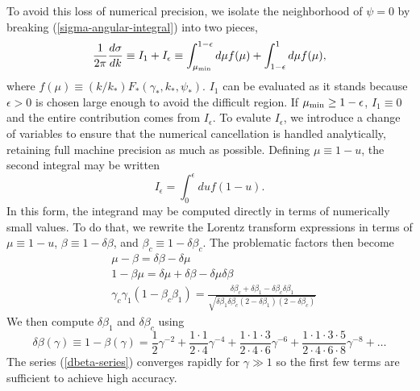 \documentclass[12pt]{article}
\begin{document}
To avoid this loss of numerical precision, we isolate the
neighborhood of $\psi = 0$ by
breaking (\ref{sigma-angular-integral}) into two pieces,
\begin{equation}
  \frac{1}{2\pi}\frac{d\sigma}{dk} \equiv I_1 + I_\epsilon
  \equiv
   \int_{\mu_{\rm min}}^{1 - \epsilon} d\mu f(\mu)
   + \int_{1-\epsilon}^1 d\mu f(\mu),
\end{equation}
where $f(\mu) \equiv (k/k_*)F_*(\gamma_*, k_*, \psi_*)$.
$I_1$ can be evaluated as it stands because $\epsilon > 0$ is
chosen large enough to avoid the difficult region. If $\mu_{\rm min}
\geq 1 - \epsilon$, $I_1 \equiv 0$ and the entire contribution
comes from $I_\epsilon$. To evalute $I_\epsilon$, we introduce
a change of variables to ensure that the numerical cancellation
is handled analytically, retaining full machine precision
as much as possible. Defining $\mu \equiv 1 - u$,
the second integral may be written
\begin{equation}
  I_\epsilon = \int_0^\epsilon du f(1-u).
\end{equation}
In this form, the integrand may be computed directly in terms of
numerically small values.  To do that, we rewrite the
Lorentz transform expressions in terms of $\mu \equiv 1-u$,
$\beta \equiv 1 - \delta\beta$, and
$\beta_c \equiv 1 - \delta\beta_c$.  The problematic factors
then become
\begin{eqnarray}
 &\mu - \beta = \delta\beta - \delta\mu \nonumber\\
 &1 - \beta\mu = \delta\mu + \delta\beta - \delta\mu\delta\beta \\
 &\gamma_c \gamma_1 (1 - \beta_c\beta_1) =
 \frac{\delta\beta_c + \delta\beta_1 - \delta\beta_c\delta\beta_1}{
\sqrt{\delta\beta_1\delta\beta_c(2-\delta\beta_1)(2-\delta\beta_c)}\nonumber
 }
\end{eqnarray}
We then compute $\delta\beta_1$ and $\delta\beta_c$
using
\begin{equation}
 \delta\beta(\gamma) \equiv 1 - \beta(\gamma) =
   \frac{1}{2}\gamma^{-2}
 + \frac{1\cdot 1}{2\cdot 4}\gamma^{-4}
 + \frac{1\cdot 1 \cdot 3}{2\cdot 4 \cdot 6}\gamma^{-6}
 + \frac{1\cdot 1 \cdot 3 \cdot 5}{2\cdot 4 \cdot 6 \cdot 8}\gamma^{-8}
 + \dots
\label{dbeta-series}
\end{equation}
The series
(\ref{dbeta-series}) converges
rapidly for $\gamma \gg 1$ so the first few terms are sufficient to achieve
high accuracy.
\end{document}
